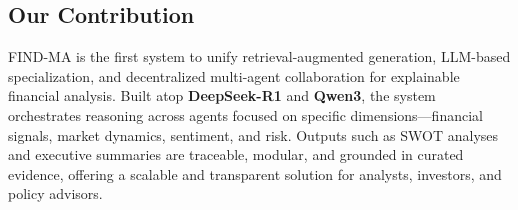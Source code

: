 \documentclass[11pt]{article}
\begin{document}
\subsection*{Our Contribution}

FIND-MA is the first system to unify retrieval-augmented generation, LLM-based specialization, and decentralized multi-agent collaboration for explainable financial analysis. Built atop \textbf{DeepSeek-R1} and \textbf{Qwen3}, the system orchestrates reasoning across agents focused on specific dimensions—financial signals, market dynamics, sentiment, and risk. Outputs such as SWOT analyses and executive summaries are traceable, modular, and grounded in curated evidence, offering a scalable and transparent solution for analysts, investors, and policy advisors.










\end{document}
